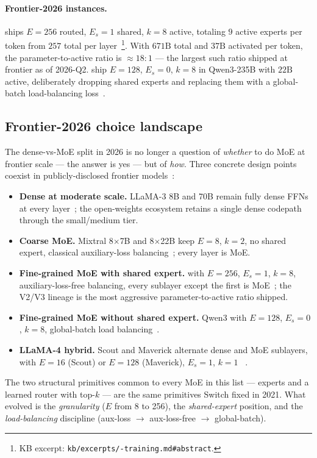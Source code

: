 \paragraph{Frontier-2026 instances.}
 ships $E = 256$ routed, $E_s = 1$ shared, $k = 8$ active,
totaling $9$ active experts per token from $257$ total per
layer~\citep[abstract,
\S 2]{deepseek-v3}\footnote{KB excerpt:
\texttt{kb/excerpts/-training.md\#abstract}.}. With $671\mathrm{B}$
total  and $37\mathrm{B}$ activated per token, the
parameter-to-active ratio is $\approx 18\!:\!1$ ---
the largest such ratio shipped at frontier as of
2026-Q2. \citet{qwen3} ship $E = 128$, $E_s = 0$, $k = 8$ in
Qwen3-235B with $22\mathrm{B}$ active, deliberately dropping shared
experts and replacing them with a global-batch load-balancing
loss~\citep{qwen3}.

\subsection{Frontier-2026 choice landscape}
\label{sec:ffn-frontier}

The dense-vs-MoE split in 2026 is no longer a question of
\emph{whether} to do MoE at frontier scale --- the answer is yes ---
but of \emph{how}. Three concrete design points coexist
in publicly-disclosed frontier
models~\citep{meta-llama3,meta-llama4,deepseek-v3,qwen3,mixtral2024}:
\begin{itemize}
\item \textbf{Dense at moderate scale.} LLaMA-3 8B and 70B remain
    fully dense  FFNs at every layer~\citep{meta-llama3}; the
    open-weights ecosystem retains a single dense codepath through
    the small/medium tier.
\item \textbf{Coarse MoE.} Mixtral 8$\times$7B and 8$\times$22B keep
    $E = 8$, $k = 2$, no shared expert, classical
    auxiliary-loss balancing~\citep{mixtral2024}; every layer is MoE.
\item \textbf{Fine-grained MoE with shared expert.}  with
    $E = 256$, $E_s = 1$, $k = 8$, auxiliary-loss-free balancing,
    every  sublayer except the first is
    MoE~\citep{deepseek-v3}; the V2/V3 lineage is the most
    aggressive parameter-to-active ratio shipped.
\item \textbf{Fine-grained MoE without shared expert.} Qwen3 with
    $E = 128$, $E_s = 0$, $k = 8$, global-batch load
    balancing~\citep{qwen3}.
\item \textbf{LLaMA-4 hybrid.} Scout and Maverick alternate dense and
    MoE  sublayers, with $E = 16$ (Scout) or $E = 128$ (Maverick),
    $E_s = 1$, $k = 1$ ~\citep{meta-llama4}.
\end{itemize}
The two structural primitives common to every MoE in this list ---
 experts and a learned  router with top-$k$ ---
are the same primitives Switch fixed in 2021. What evolved is the
\emph{granularity} ($E$ from 8 to 256), the \emph{shared-expert}
position, and the \emph{load-balancing} discipline (aux-loss $\to$
aux-loss-free $\to$ global-batch).

